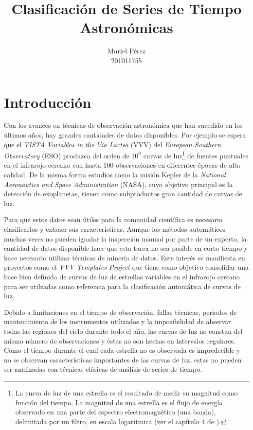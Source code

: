 \documentclass[letterpaper,12pt]{book}
\title{Clasificación de Series de Tiempo Astronómicas}
\author{Muriel Pérez\\ 201011755}
\begin{document}
\maketitle
\tableofcontents 
\chapter{Introducción}

Con los avances en técnicas de observación astronómica que han sucedido en los últimos años, hay grandes cantidades de datos disponibles. Por ejemplo se espera que el \textit{VISTA Variables in the Via Lactea} (VVV) del \textit{European Southern Observatory} (ESO) produzca del orden de $10^{9}$ curvas de luz\footnote{\label{nota:curvasDeLuz} La curva de luz de una estrella es el resultado de medir su magnitud como función del tiempo. La magnitud de una estrella es el flujo de energía observado en una parte del espectro electromagnético (una banda), delimitada por un filtro, en escala logarítmica (ver el capítulo 4 de \cite{karttunen_fundamental_2007}).} de fuentes puntuales en el infrarojo cercano con hasta 100 observaciones en diferentes épocas de alta calidad. De la misma forma estudios como la misión Kepler de la \textit{National Aeronautics and Space Administration} (NASA), cuyo objetivo principal es la detección de exoplanetas,  tienen como subproductos gran cantidad de curvas  de luz. 

Para que estos datos sean útiles para la comunidad científica es necesario clasificarlos y extraer sus características. Aunque los métodos automáticos muchas veces no pueden igualar la inspección manual por parte de un experto, la cantidad de datos disponible hace que esta tarea no sea posible en corto tiempo y hace necesario utilizar técnicas de minería de datos. Este interés se manifiesta en proyectos como el \textit{VVV Templates Project} que tiene como objetivo consolidar una base bien definida de curvas de luz de estrellas variables en el infrarojo cercano para ser utilzadas como referencia para la clasificación automática de curvas de luz.

Debido a limitaciones en el tiempo de observación, fallas técnicas, periodos de mantenimiento de los instrumentos utilizados y la imposibilidad de abservar todas las regiones del cielo durante todo el año, las curvas de luz no constan del mismo número de observaciones y éstas no son hechas en intervalos regulares. Como el tiempo durante el cual cada estrella no es observada es impredecible y no se observan características importantes de las curvas de luz,  estas no pueden ser analizadas con técnicas clásicas de análisis de series de tiempo.
\end{document}
